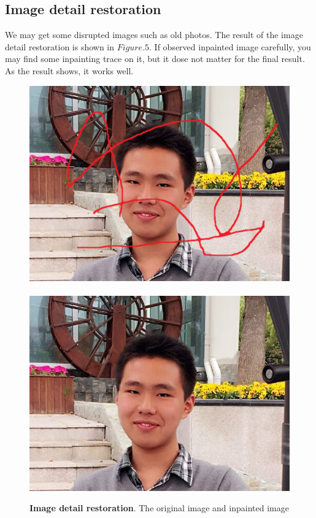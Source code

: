 \subsection*{Image detail restoration}
We may get some disrupted images such as old photos. The result of the image detail restoration is shown in $Figure.5$. If observed inpainted image carefully, you may find some inpainting trace on it, but it dose not matter for the final result. As the result shows, it works well.
\begin{figure}
	\centering
	\includegraphics[width=0.9\linewidth]{zouyikai.png}\\\ \\
	\includegraphics[width=0.9\linewidth]{zouyikai_result.png}
	\caption{\textbf{Image detail restoration}. The original image and inpainted image}
\end{figure}